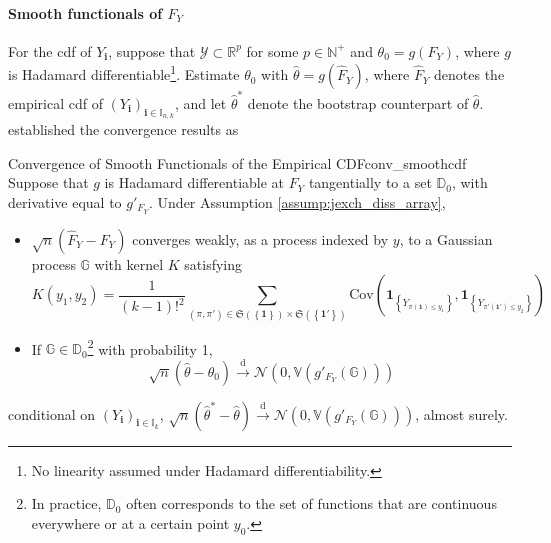 \documentclass[twoside]{article}
\begin{document}
\paragraph*{Smooth functionals of $F_Y$} For the cdf of $Y_{\mathbf{i}}$, suppose that $\mathcal{Y}\subset \mathbb{R}^p$ for some $p\in\mathbb{N}^+$ and $\theta_0 = g(F_Y)$, where $g$ is Hadamard differentiable\footnote{No linearity assumed under Hadamard differentiability.}. Estimate $\theta_0$ with $\hat{\theta}=g\left(\hat{F}_Y\right)$, where $\hat{F}_Y$ denotes the empirical cdf of $\left(Y_{\mathbf{i}}\right)_{\mathbf{i}\in\mathbb{I}_{n,k}}$, and let $\hat{\theta}^*$ denote the bootstrap counterpart of $\hat{\theta}$.
\citet{davezies2021empirical} established the convergence results as 
\begin{theorem}{Convergence of Smooth Functionals of the Empirical CDF}{conv_smoothcdf}
    Suppose that $g$ is Hadamard differentiable at $F_Y$ tangentially to a set $\mathbb{D}_0$, with derivative equal to $g'_{F_Y}$. Under Assumption \ref{assump:jexch_diss_array},
    \begin{itemize}
        \item $\sqrt{n}\left( \hat{F}_Y-F_Y \right)$ converges weakly, as a process indexed by $y$, to a Gaussian process $\mathbb{G}$ with kernel $K$ satisfying 
        $$
        K\left(y_1,y_2\right) = \frac{1}{(k-1)!^2}\sum_{\left(\pi,\pi'\right)\in \mathfrak{S}\left(\left\{\mathbf{1}\right\}\right) \times \mathfrak{S}\left(\left\{\mathbf{1}'\right\}\right)}\mathrm{Cov}\left( \mathbf{1}_{\left\{Y_{\pi(\mathbf{1})\leq y_1}\right\}},\mathbf{1}_{\left\{Y_{\pi '(\mathbf{1}')\leq y_2}\right\}} \right)
        $$
        \item If $\mathbb{G}\in \mathbb{D}_0$\footnote{In practice, $\mathbb{D}_0$ often corresponds to the set of functions that are continuous everywhere or at a certain point $y_0$.} with probability 1, $$ \sqrt{n}\left(\hat{\theta}-\theta_0\right) \xrightarrow{\mathrm{d}} \mathcal{N}\left(0, \mathbb{V}\left(g'_{F_Y}\left(\mathbb{G}\right)\right)\right) $$
    \end{itemize}
    conditional on $\left(Y_{\mathbf{i}}\right)_{\mathbf{i}\in\mathbb{I}_k}$, $\sqrt{n}\left(\hat{\theta}^*-\hat{\theta}\right)\xrightarrow{\mathrm{d}} \mathcal{N}\left(0, \mathbb{V}\left(g'_{F_Y}\left(\mathbb{G}\right)\right)\right)$, almost surely.
\end{theorem}
\end{document}
